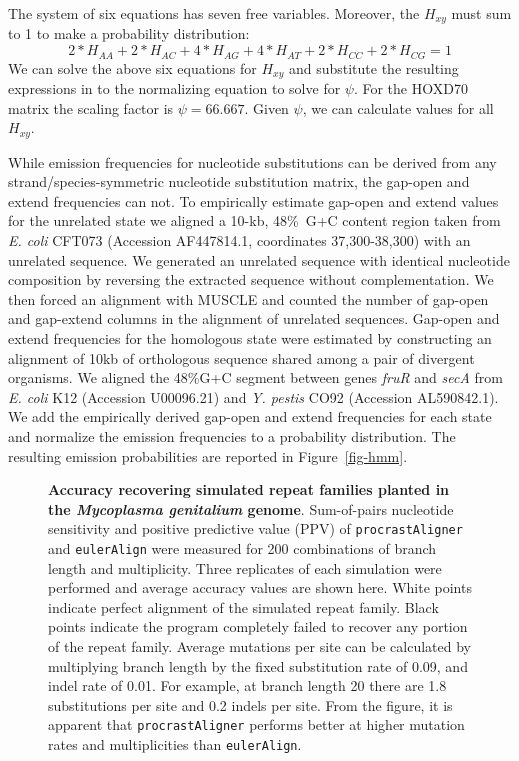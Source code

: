 \documentclass[10pt,journal,letterpaper,compsoc,peerreview]{IEEEtran}
\begin{document}
The system of six equations has seven free variables.  Moreover, the $H_{xy}$ must sum to 1 to make a probability distribution:
\begin{equation}
2*H_{AA} + 2*H_{AC} + 4*H_{AG} + 4*H_{AT} + 2*H_{CC} + 2*H_{CG} = 1
\end{equation}
We can solve the above six equations for $H_{xy}$ and substitute the
resulting expressions in to the normalizing equation to solve for
$\psi$. For the HOXD70 matrix the scaling factor is $\psi=66.667$. Given
$\psi$, we can calculate values for all $H_{xy}$.


While emission frequencies for nucleotide substitutions can be derived from
any strand/species-symmetric nucleotide substitution matrix, the gap-open
and extend frequencies can not.  To empirically estimate gap-open and extend values
for the unrelated state we aligned a 10-kb, 48\%~G+C content region
taken from \emph{E. coli} CFT073 (Accession AF447814.1, coordinates
37,300-38,300) with an unrelated sequence.  We generated an unrelated
sequence with identical nucleotide composition by reversing the
extracted sequence without complementation.  We then forced an
alignment with MUSCLE and counted the number of gap-open and gap-extend
columns in the alignment of unrelated sequences.  Gap-open and
extend frequencies for the homologous state were estimated by
constructing an alignment of 10kb of orthologous sequence shared among
a pair of divergent organisms.  We aligned the 48\%G+C segment between
genes \textit{fruR} and \textit{secA} from \textit{E. coli} K12
(Accession U00096.21) and \emph{Y. pestis} CO92 (Accession
AL590842.1). We add the empirically derived gap-open and extend
frequencies for each state and normalize the emission frequencies to a
probability distribution.  The resulting emission probabilities are
reported in Figure~\ref{fig-hmm}.


\begin{figure*}[t!]
\centering {}
\caption[Accuracy recovering simulated repeat families planted in the
\textit{Mycoplasma genitalium} genome]%
{\textbf{Accuracy recovering simulated repeat families planted in the
\textit{Mycoplasma genitalium} genome}.  Sum-of-pairs nucleotide
sensitivity and positive predictive value (PPV) of \texttt{procrastAligner}
and \texttt{eulerAlign} were measured for 200
combinations of branch length and multiplicity.  Three replicates of
each simulation were performed and average accuracy values are shown
here.  White points indicate perfect alignment of the simulated repeat
family.  Black points indicate the program completely failed to
recover any portion of the repeat family.  Average mutations per site can be
calculated by multiplying branch length by the fixed substitution rate
of 0.09, and indel rate of 0.01.  For example, at branch length 20
there are 1.8 substitutions per site and 0.2 indels per site.  From
the figure, it is apparent that \texttt{procrastAligner} performs better
at higher mutation rates and multiplicities than \texttt{eulerAlign}.}
\label{fig-results}
\end{figure*}
\end{document}
